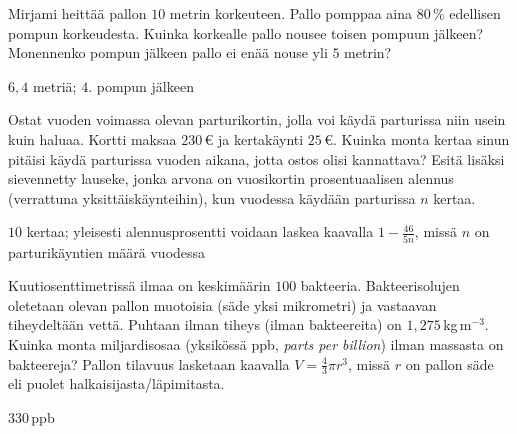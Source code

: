 		\begin{tehtava}
Mirjami heittää pallon $10$ metrin korkeuteen. Pallo pomppaa aina $80$\,\% edellisen pompun korkeudesta. Kuinka korkealle pallo nousee toisen pompuun jälkeen? Monennenko pompun jälkeen pallo ei enää nouse yli $5$ metrin?
	\begin{vastaus}
	 $6,4$ metriä; $4$. pompun jälkeen
	\end{vastaus}
	\end{tehtava}
	
	\begin{tehtava}
Ostat vuoden voimassa olevan parturikortin, jolla voi käydä parturissa niin usein kuin haluaa. Kortti maksaa $230$\,€ ja kertakäynti $25$\,€. Kuinka monta kertaa sinun pitäisi käydä parturissa vuoden aikana, jotta ostos olisi kannattava? Esitä lisäksi sievennetty lauseke, jonka arvona on vuosikortin prosentuaalisen alennus (verrattuna yksittäiskäynteihin), kun vuodessa käydään parturissa $n$ kertaa.
	\begin{vastaus}
	 $10$ kertaa; yleisesti alennusprosentti voidaan laskea kaavalla $1-\frac{46}{5n}$, missä $n$ on parturikäyntien määrä vuodessa
	\end{vastaus}
	\end{tehtava}
	
\begin{tehtava}
	\begin{vastaus}
		\alakohdat{
	§ $1,02$\,kg
	§ $10,2$\,\%
	}
	\end{vastaus}
	\end{tehtava}
	
\begin{tehtava}
Kuutiosenttimetrissä ilmaa on keskimäärin $100$ bakteeria. Bakteerisolujen oletetaan olevan pallon muotoisia (säde yksi mikrometri) ja vastaavan tiheydeltään vettä. Puhtaan ilman tiheys (ilman bakteereita) on $1,275$\,kg\,m$^{-3}$. Kuinka monta miljardisosaa (yksikössä ppb, \textit{parts per billion}) ilman massasta on bakteereja? Pallon tilavuus lasketaan kaavalla $V=\frac{4}{3}\pi r^3$, missä $r$ on pallon säde eli puolet halkaisijasta/läpimitasta.
	\begin{vastaus}
	$330$\,ppb %
	\end{vastaus}
\end{tehtava}	
	
